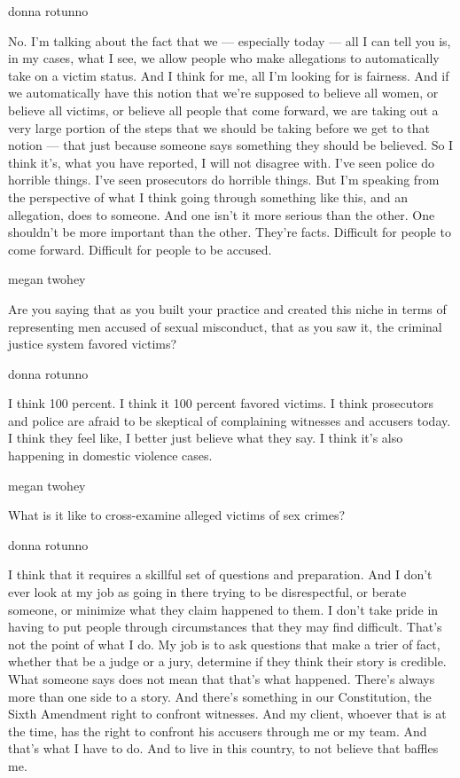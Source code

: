 donna rotunno

No. I'm talking about the fact that we --- especially today --- all I
can tell you is, in my cases, what I see, we allow people who make
allegations to automatically take on a victim status. And I think for
me, all I'm looking for is fairness. And if we automatically have this
notion that we're supposed to believe all women, or believe all victims,
or believe all people that come forward, we are taking out a very large
portion of the steps that we should be taking before we get to that
notion --- that just because someone says something they should be
believed. So I think it's, what you have reported, I will not disagree
with. I've seen police do horrible things. I've seen prosecutors do
horrible things. But I'm speaking from the perspective of what I think
going through something like this, and an allegation, does to someone.
And one isn't it more serious than the other. One shouldn't be more
important than the other. They're facts. Difficult for people to come
forward. Difficult for people to be accused.

megan twohey

Are you saying that as you built your practice and created this niche in
terms of representing men accused of sexual misconduct, that as you saw
it, the criminal justice system favored victims?

donna rotunno

I think 100 percent. I think it 100 percent favored victims. I think
prosecutors and police are afraid to be skeptical of complaining
witnesses and accusers today. I think they feel like, I better just
believe what they say. I think it's also happening in domestic violence
cases.

megan twohey

What is it like to cross-examine alleged victims of sex crimes?

donna rotunno

I think that it requires a skillful set of questions and preparation.
And I don't ever look at my job as going in there trying to be
disrespectful, or berate someone, or minimize what they claim happened
to them. I don't take pride in having to put people through
circumstances that they may find difficult. That's not the point of what
I do. My job is to ask questions that make a trier of fact, whether that
be a judge or a jury, determine if they think their story is credible.
What someone says does not mean that that's what happened. There's
always more than one side to a story. And there's something in our
Constitution, the Sixth Amendment right to confront witnesses. And my
client, whoever that is at the time, has the right to confront his
accusers through me or my team. And that's what I have to do. And to
live in this country, to not believe that baffles me.

